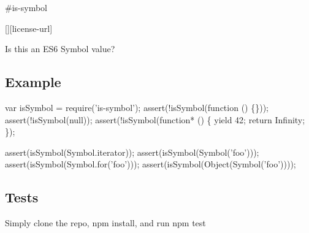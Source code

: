 \#is-\/symbol \textsuperscript{\href{https://npmjs.org/package/is-symbol}{\tt }}

\href{https://travis-ci.org/ljharb/is-symbol}{\tt } \href{https://david-dm.org/ljharb/is-symbol}{\tt } \href{https://david-dm.org/ljharb/is-symbol#info=devDependencies}{\tt } \mbox{[}\mbox{]}\mbox{[}license-\/url\mbox{]} \href{http://npm-stat.com/charts.html?package=is-symbol}{\tt }

\href{https://npmjs.org/package/is-symbol}{\tt }

\href{https://ci.testling.com/ljharb/is-symbol}{\tt }

Is this an E\+S6 Symbol value?

\subsection*{Example}


\begin{DoxyCode}
var isSymbol = require('is-symbol');
assert(!isSymbol(function () \{\}));
assert(!isSymbol(null));
assert(!isSymbol(function* () \{ yield 42; return Infinity; \});

assert(isSymbol(Symbol.iterator));
assert(isSymbol(Symbol('foo')));
assert(isSymbol(Symbol.for('foo')));
assert(isSymbol(Object(Symbol('foo'))));
\end{DoxyCode}


\subsection*{Tests}

Simply clone the repo, {\ttfamily npm install}, and run {\ttfamily npm test} 